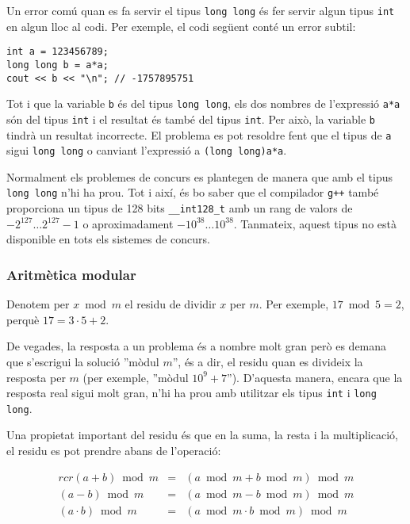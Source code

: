 Un error comú quan es fa servir el tipus \texttt{long long}
és fer servir algun tipus \texttt{int} en algun lloc
al codi.
Per exemple, el codi següent conté
un error subtil:

\begin{lstlisting}
int a = 123456789;
long long b = a*a;
cout << b << "\n"; // -1757895751
\end{lstlisting}

Tot i que la variable \texttt{b} és del tipus \texttt{long long},
els dos nombres de l'expressió \texttt{a*a}
són del tipus \texttt{int} i el resultat és
també del tipus \texttt{int}.
Per això, la variable \texttt{b} tindrà
un resultat incorrecte.
El problema es pot resoldre fent que el tipus
de \texttt{a} sigui \texttt{long long} o
canviant l'expressi\'o a \texttt{(long long)a*a}.

Normalment els problemes de concurs es plantegen de manera que
amb el tipus \texttt{long long} n'hi ha prou.
Tot i així, és bo saber que el compilador \texttt{g++} també proporciona
un tipus de 128 bits \texttt{\_\_int128\_t}
amb un rang de valors de
$-2^{127} \ldots 2^{127}-1$ o aproximadament $-10^{38} \ldots 10^{38}$.
Tanmateix, aquest tipus no està disponible en tots els sistemes de concurs.

\subsubsection{Aritmètica modular}


Denotem per $x \bmod m$ el residu
de dividir $x$ per $m$.
Per exemple, $17 \bmod 5 = 2$,
perquè $17 = 3 \cdot 5 + 2$.

De vegades, la resposta a un problema és a
nombre molt gran però es demana que s'escrigui
la soluci\'o ''mòdul $m$'', és a dir,
el residu quan es divideix la resposta per $m$
(per exemple, ''mòdul $10^9+7$'').
D'aquesta manera, encara que la resposta real
sigui molt gran,
n'hi ha prou amb utilitzar els tipus
\texttt{int} i \texttt{long long}.

Una propietat important del residu és que
en la suma, la resta i la multiplicació,
el residu es pot prendre abans de l'operació:

\[
\begin{matrix}{rcr}
(a+b) \bmod m & = & (a \bmod m + b \bmod m) \bmod m \\
(a-b) \bmod m & = & (a \bmod m - b \bmod m) \bmod m \\
(a \cdot b) \bmod m & = & (a \bmod m \cdot b \bmod m) \bmod m
\end{matrix}
\]

